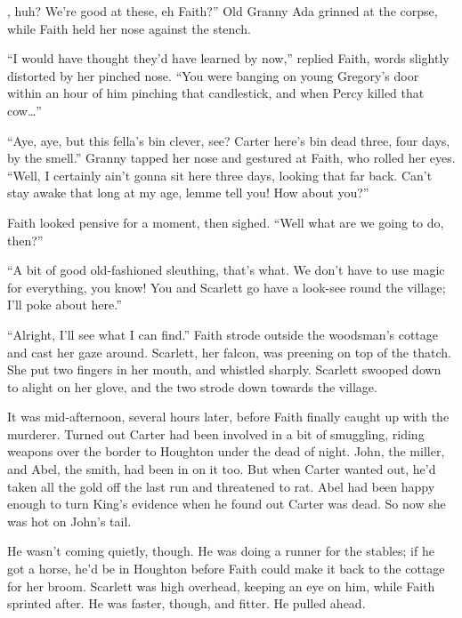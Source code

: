 
, huh?
We're good at these, eh Faith?''
Old Granny Ada grinned at the corpse, while Faith held her nose against the stench.

``I would have thought they'd have learned by now,''
replied Faith, words slightly distorted by her pinched nose.
``You were banging on young Gregory's door within an hour of him pinching that candlestick, and when Percy killed that cow{\dots}''

``Aye, aye, but this fella's bin clever, see?
Carter here's bin dead three, four days, by the smell.''
Granny tapped her nose and gestured at Faith, who rolled her eyes.
``Well, I certainly ain't gonna sit here three days, looking that far back.
Can't stay awake that long at my age, lemme tell you!
How about you?''

Faith looked pensive for a moment, then sighed.
``Well what are we going to do, then?''

``A bit of good old-fashioned sleuthing, that's what.
We don't have to use magic for everything, you know!
You and Scarlett go have a look-see round the village;
I'll poke about here.''

\newcommand\foretellingstoryrepeat{%
	``Alright, I'll see what I can find.''
	Faith strode outside the woodsman's cottage and cast her gaze around.
	Scarlett, her falcon, was preening on top of the thatch.
	She put two fingers in her mouth,
}%
{\foretellingstoryrepeat}
and whistled sharply.
Scarlett swooped down to alight on her glove, and the two strode down towards the village.

\storybreak

It was mid-afternoon, several hours later, before Faith finally caught up with the murderer.
Turned out Carter had been involved in a bit of smuggling, riding weapons over the border to Houghton under the dead of night.
John, the miller, and Abel, the smith, had been in on it too.
But when Carter wanted out, he'd taken all the gold off the last run and threatened to rat.
Abel had been happy enough to turn King's evidence when he found out Carter was dead.
So now she was hot on John's tail.

He wasn't coming quietly, though.
He was doing a runner for the stables; if he got a horse, he'd be in Houghton before Faith could make it back to the cottage for her broom.
Scarlett was high overhead, keeping an eye on him, while Faith sprinted after.
He was faster, though, and fitter.
He pulled ahead.


